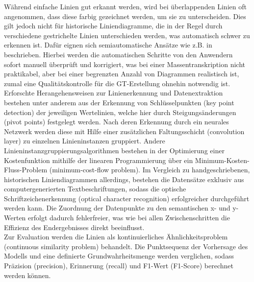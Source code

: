 Während einfache Linien gut erkannt werden, wird bei überlappenden Linien oft angenommen, dass diese farbig gezeichnet werden, um sie zu unterscheiden. Dies gilt jedoch nicht für historische Liniendiagramme, die in der Regel durch verschiedene gestrichelte Linien unterschieden werden, was automatisch schwer zu erkennen ist. Dafür eignen sich semiautomatische Ansätze wie z.B. in \cite{inproceedings} beschrieben. Hierbei werden die automatischen Schritte von den Anwendern sofort manuell überprüft und korrigiert, was bei einer Massentranskription nicht praktikabel, aber bei einer begrenzten Anzahl von Diagrammen realistisch ist, zumal eine Qualitätskontrolle für die GT-Erstellung ohnehin notwendig ist.
\\
Erforschte Herangehensweisen \cite{9423395} zur Linienerkennung und Datenextraktion bestehen unter anderem aus der Erkennung von Schlüsselpunkten (key point detection) der jeweiligen Wertelinien, welche hier durch Steigungsänderungen (pivot points) festgelegt werden. Nach deren Erkennung durch ein neurales Netzwerk werden diese mit Hilfe einer zusätzlichen Faltungsschicht (convolution layer) zu einzelnen Linieninstanzen gruppiert. Andere Linieninstanzgruppierungsalgorithmen \cite{parsingimages} bestehen in der Optimierung einer Kostenfunktion mithilfe der linearen Programmierung über ein Minimum-Kosten-Fluss-Problem (minimum-cost-flow problem). Im Vergleich zu handgeschriebenen, historischen Liniendiagrammen allerdings, bestehen die Datensätze exklusiv aus computergenerierten Textbeschriftungen, sodass die optische Schriftzeichenerkennung (optical character recognition) erfolgreicher durchgeführt werden kann. Die Zuordnung der Datenpunkte zu den semantischen x- und y-Werten erfolgt dadurch fehlerfreier, was wie bei allen Zwischenschritten die Effizienz des Endergebnisses direkt beeinflusst.
\\
Zur Evaluation werden die Linien als kontinuierliches Ähnlichkeitsproblem (continuous similarity problem) behandelt. Die Punktsequenz der Vorhersage des Modells und eine definierte Grundwahrheitsmenge werden verglichen, sodass Präzision (precision), Erinnerung (recall) und F1-Wert (F1-Score) berechnet werden können.
